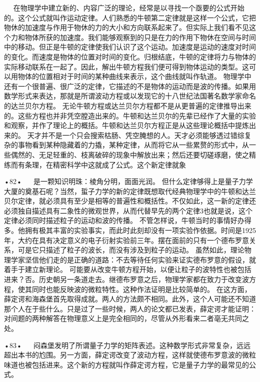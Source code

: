   
在物理学中建立新的、内容广泛的理论，经常是以寻找一个亟要的公式开始的。这个公式就叫作运动定律。人们熟悉的牛顿第二定律就是这样一个公式，它把物休的加速度与作用于物休的力的大小和方向联系起来了。但实际上我们看不见这个力和物体所获的加速度。我们能够观察到的只是在力的作用下物休在空间与时间中的移动。但正是牛顿的定律使我们认识了这个运动。加速度是运动的速度对时间的变化。而速度是物体的位置对时间的变化。归根结底，牛顿的定律将力与物体的实际移动联系在一起了。因此，解出牛顿方程我们便可得到物体运动的类型。这可以用物体的位置相对于时间的某种曲线来表示，这个曲线就叫作轨道。
物理学中还有一个很普遍、很广泛的定律，它描述的不是物体的运动而是波的传播。如果用数学形式来表达，那就是所谓波动方程或以发现它的十八世纪法国著名数学家命名的达兰贝尔方程。
无论牛顿方程或达兰贝尔方程都不是从更普遍的定律推导出来的。这些方程也并非凭空膛造出来的。牛顿和达兰贝尔的先辈已经作了大量的实验和观察，并作了理论上的概括。牛顿和达兰贝尔方程正是从这些理论概括中提炼出来的。
天才并不是一个只会搜索枯肠、凭空腌想的人。天才必须能够透过错综复杂的事物看到某种隐藏着的力撬，某种定律，从而将它从一些累赘的形式中，从一些偶然的、无足轻重的、枝离破碎的现象中解放出来；然后还要切磋琢磨，使之精练而有条理，在精密科学中这就成了公式。这个新定律就象

•82•
  
是一颗知识明珠：棱角分明，面面光润。
但什么定律够得上是量子力学大厦的奠基石呢？当然，蜇子力学的新的定律既想取代经典物理学中的牛顿和达兰贝尔定律，就必须具有至少是相等的普遍性和概括性。不仅如此，这一新的定律还必须独自描述具有二象性的微观世界，从而代替早先的两个定律3也就是说，这个定律必须同时描述粒子的运动和波的传播。
不管怎样说，牛顿当时的事情好办得多。他拥有极其丰富的实验事实，而此时此刻却没有一项实验作依据。时间是1925年，大约在具有决定意义的电子衍射实验前三年。摆在面前的只有一个德布罗意关系，可是它只描述了粒子的波长，而没有涉及到粒子的运动。
虽然如此，理论物理学家坚信他们走的是正确的道路：不去等待任何实验来证实德布罗意的假设，就着手于建立新理论。
可能要从改变牛顿方程开始，以便让粒子的波特性也被包括进来？否。历史朝另一条道走去。继德布罗意之后，物理学家都在致力于改变波方程，使其同时也能反映波的微粒特性。这种作法证明是比较简单的。
在这方面，薛定谔和海森堡首先取得成就。两人的方法颇不相同。此外，这个人可能还不知道那个人在于些什么。只是过了一些时候，两人的论文都已发表，薛定谔才能证明：对间题的两种解答在物理意义上是完全相同的，尽管从外形看来二者亳无共同之处。

•83•
  
闷森堡发明了所谓量子力学的矩阵表述。这种数学形式非常复杂，远远超出本书的尥围。另一方面，薛定谔改变了波动方程，这样就使德布罗意波的微粒味道也被包括进来。这个新的方程就叫作薛定谔方程，它是量子力学的最常见的公式。


